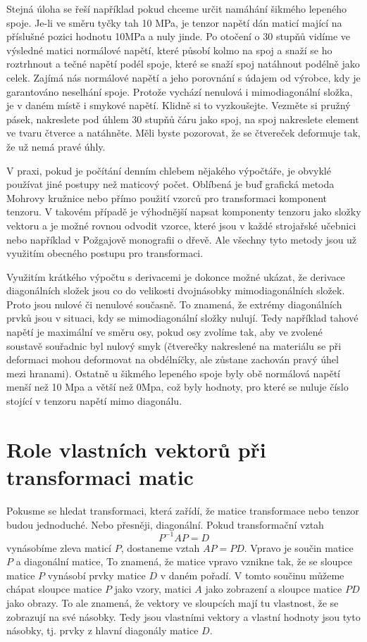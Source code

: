 \documentclass[12pt]{article}
\begin{document}
Stejná úloha se řeší například pokud chceme určit namáhání šikmého lepeného spoje. Je-li ve směru tyčky tah 10 MPa, je tenzor napětí dán maticí mající na příslušné pozici hodnotu 10MPa a nuly jinde. Po otočení o 30 stupňů vidíme ve výsledné matici normálové napětí, které působí kolmo na spoj a snaží se ho roztrhnout a tečné napětí podél spoje, které se snaží spoj natáhnout podélně jako celek. Zajímá nás normálové napětí a jeho porovnání s údajem od výrobce, kdy je garantováno neselhání spoje. Protože vychází nenulová i mimodiagonální složka, je v daném místě i smykové napětí. Klidně si to vyzkoušejte. Vezměte si pružný pásek, nakreslete pod úhlem 30 stupňů čáru jako spoj, na spoj nakreslete element ve tvaru čtverce a natáhněte. Měli byste pozorovat, že se čtvereček deformuje tak, že už nemá pravé úhly. 

V praxi, pokud je počítání denním chlebem nějakého výpočtáře, je obvyklé používat jiné postupy než maticový počet. Oblíbená je buď grafická metoda Mohrovy kružnice nebo přímo použití vzorců pro transformaci komponent tenzoru. V takovém případě je výhodnější napsat komponenty tenzoru jako složky vektoru a je možné rovnou odvodit vzorce, které jsou v každé strojařské učebnici nebo například v Požgajově monografii o dřevě. Ale všechny tyto metody jsou už využitím obecného postupu pro transformaci. 

Využitím krátkého výpočtu s derivacemi je dokonce možné ukázat, že derivace diagonálních složek jsou co do velikosti dvojnásobky mimodiagonálních složek. Proto jsou nulové či nenulové současně. To znamená, že extrémy diagonálních prvků jsou v situaci, kdy se mimodiagonální složky nulují. Tedy například tahové napětí je maximální ve směru osy, pokud osy zvolíme tak, aby ve zvolené soustavě souřadnic byl nulový smyk (čtverečky nakreslené na materiálu se při deformaci mohou deformovat na obdélníčky, ale zůstane zachován pravý úhel mezi hranami). Ostatně u šikmého lepeného spoje byly obě normálová napětí menší než 10 Mpa a větší než 0Mpa, což byly hodnoty, pro které se nuluje číslo stojící v tenzoru napětí mimo diagonálu.


\section{Role vlastních vektorů při transformaci matic}

Pokusme se hledat transformaci, která zařídí, že matice transformace nebo tenzor budou jednoduché. Nebo přesněji, diagonální. Pokud transformační vztah $$P^{-1}AP=D$$ vynásobíme zleva maticí $P$, dostaneme vztah $AP=PD$. Vpravo je součin matice $P$ a diagonální matice, To znamená, že matice vpravo vznikne tak, že se sloupce matice $P$ vynásobí prvky matice $D$ v daném pořadí. V tomto součinu můžeme chápat sloupce matice $P$ jako vzory, matici $A$ jako zobrazení a sloupce matice $PD$ jako obrazy. To ale znamená, že vektory ve sloupcích mají tu vlastnost, že se zobrazují na své násobky. Tedy jsou vlastními vektory a vlastní hodnoty jsou tyto násobky, tj. prvky z hlavní diagonály matice $D$.
\end{document}
